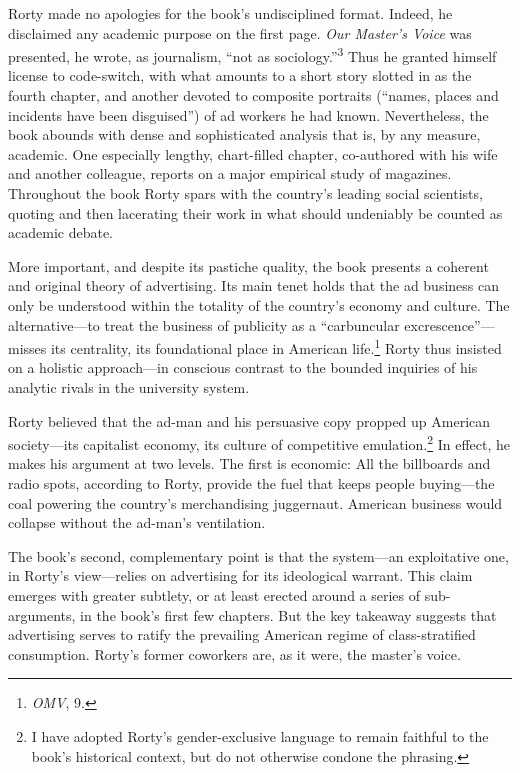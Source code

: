 \documentclass[nohyper,openany,nobib]{tufte-book}
\begin{document}
Rorty made no apologies for the book's undisciplined format. Indeed, he
disclaimed any academic purpose on the first page. \emph{Our Master's
Voice} was presented, he wrote, as journalism, ``not as sociology.''\textsuperscript{3}
Thus he granted himself license to code-switch, with what amounts to a
short story slotted in as the fourth chapter, and another devoted \setcounter{footnote}{3}to
composite portraits (``names, places and incidents have been
disguised'') of ad workers he had known. Nevertheless, the book abounds
with dense and sophisticated analysis that is, by any measure, academic.
One especially lengthy, chart-filled chapter, co-authored with his wife
and another colleague, reports on a major empirical study of magazines.
Throughout the book Rorty spars with the country's leading social
scientists, quoting and then lacerating their work in what should
undeniably be counted as academic debate.

More important, and despite its pastiche quality, the book presents a
coherent and original theory of advertising. Its main tenet holds that
the ad business can only be understood within the totality of the
country's economy and culture. The alternative---to treat the business
of publicity as a ``carbuncular excrescence''---misses its centrality,
its foundational place in American life.\footnote{\emph{OMV}, 9.} Rorty thus insisted on a
holistic approach---in conscious contrast to the bounded inquiries of
his analytic rivals in the university system.

Rorty believed that the ad-man and his persuasive copy propped up
American society---its capitalist economy, its culture of competitive
emulation.\footnote{I have adopted Rorty's gender-exclusive language to remain faithful to
  the book's historical context, but do not otherwise condone the
  phrasing.
} In effect, he makes his argument at two levels. The first
is economic: All the billboards and radio spots, according to Rorty,
provide the fuel that keeps people buying---the coal powering the
country's merchandising juggernaut. American business would collapse
without the ad-man's ventilation.

The book's second, complementary point is that the system---an
exploitative one, in Rorty's view---relies on advertising for its
ideological warrant. This claim emerges with greater subtlety, or at
least erected around a series of sub-arguments, in the book's first few
chapters. But the key takeaway suggests that advertising serves to
ratify the prevailing American regime of class-stratified consumption.
Rorty's former coworkers are, as it were, the master's voice.
\end{document}
